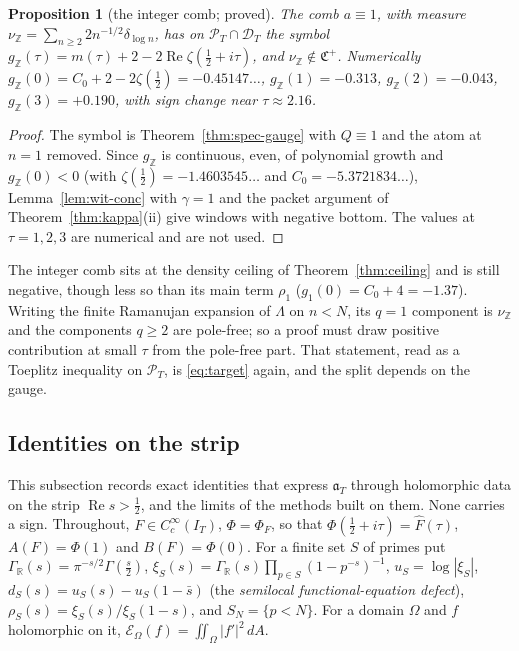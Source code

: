 \documentclass[11pt]{amsart}
\newtheorem{proposition}[theorem]{Proposition}
\theoremstyle{definition}
\theoremstyle{remark}
\newcommand{\R}{\mathbb R}
\newcommand{\Z}{\mathbb Z}
\newcommand{\Rel}{\operatorname{Re}}
\newcommand{\PT}{\mathcal P_T}
\newcommand{\IT}{I_T}
\newcommand{\Fh}{\widehat F}
\begin{document}
\begin{proposition}[the integer comb; proved]\label{prop:spec-intcomb}
The comb $a\equiv1$, with measure $\nu_\Z=\sum_{n\ge2}2n^{-1/2}\delta_{\log n}$, has on $\PT\cap\mathcal D_T$ the symbol
$g_\Z(\tau)=m(\tau)+2-2\Rel\zeta(\frac12+i\tau)$, and $\nu_\Z\notin\mathfrak C^+$. Numerically $g_\Z(0)=C_0+2-2\zeta(\frac12)=-0.45147\ldots$,
$g_\Z(1)=-0.313$, $g_\Z(2)=-0.043$, $g_\Z(3)=+0.190$, with sign change near $\tau\approx2.16$.
\end{proposition}
\begin{proof}
The symbol is Theorem~\ref{thm:spec-gauge} with $Q\equiv1$ and the atom at $n=1$ removed. Since $g_\Z$ is continuous, even, of polynomial
growth and $g_\Z(0)<0$ (with $\zeta(\frac12)=-1.4603545\ldots$ and $C_0=-5.3721834\ldots$), Lemma~\ref{lem:wit-conc} with $\gamma=1$ and
the packet argument of Theorem~\ref{thm:kappa}(ii) give windows with negative bottom. The values at $\tau=1,2,3$ are numerical and are not
used.
\end{proof}

The integer comb sits at the density ceiling of Theorem~\ref{thm:ceiling} and is still negative, though less so than its main term
$\rho_1$ ($g_1(0)=C_0+4=-1.37$). Writing the finite Ramanujan expansion of $\Lambda$ on $n<N$, its $q=1$ component is $\nu_\Z$ and the
components $q\ge2$ are pole-free; so a proof must draw positive contribution at small $\tau$ from the pole-free part. That statement,
read as a Toeplitz inequality on $\PT$, is \eqref{eq:target} again, and the split depends on the gauge.

\subsection{Identities on the strip}\label{subsec:strip}

This subsection records exact identities that express $\mathfrak a_T$ through holomorphic data on the strip $\Rel s>\frac12$, and
the limits of the methods built on them. None carries a sign. Throughout, $F\in C_c^\infty(\IT)$, $\Phi=\Phi_F$, so that
$\Phi(\frac12+i\tau)=\Fh(\tau)$, $A(F)=\Phi(1)$ and $B(F)=\Phi(0)$. For a finite set $S$ of primes put
$\Gamma_\R(s)=\pi^{-s/2}\Gamma(\frac s2)$, $\xi_S(s)=\Gamma_\R(s)\prod_{p\in S}(1-p^{-s})^{-1}$, $u_S=\log|\xi_S|$,
$d_S(s)=u_S(s)-u_S(1-\bar s)$ (the \emph{semilocal functional-equation defect}), $\rho_S(s)=\xi_S(s)/\xi_S(1-s)$, and
$S_N=\{p<N\}$. For a domain $\Omega$ and $f$ holomorphic on it, $\mathcal E_\Omega(f)=\iint_\Omega|f'|^2\,dA$.
\end{document}
